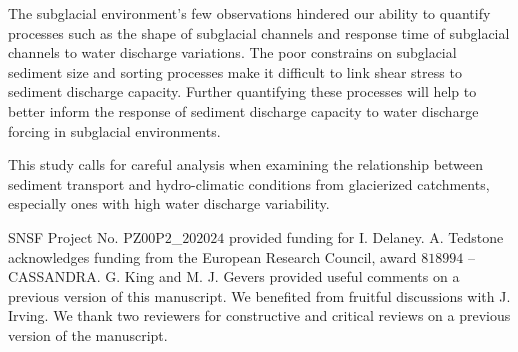\documentclass[esurf, manuscript]{copernicus}
\begin{document}
The subglacial environment's few observations hindered our ability to quantify processes such as
the shape of subglacial channels and response time of subglacial channels to water discharge variations.
The poor constrains on subglacial sediment size and sorting processes make it difficult to link shear stress to sediment discharge capacity.
Further quantifying these processes will help to better inform the response of sediment discharge capacity to water discharge forcing in subglacial environments.

This study calls for careful analysis when examining the relationship between sediment transport and hydro-climatic conditions from glacierized catchments, especially ones with high water discharge variability.







\begin{acknowledgements}
  SNSF Project No. $\mathrm{PZ00P2}$\_$202024$ provided  funding for I. Delaney.
  A. Tedstone acknowledges funding from the European Research Council, award $818994$ -- CASSANDRA.
  G. King and M. J. Gevers provided useful comments on a previous version of this manuscript.
  We benefited from fruitful discussions with J. Irving.
  We thank two reviewers for constructive and critical reviews on a previous version of the manuscript.
\end{acknowledgements}
\newpage

\end{document}
